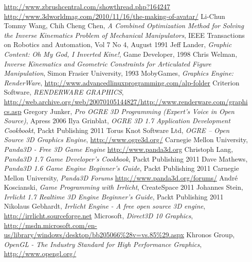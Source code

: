 \documentclass[11pt]{mwrep}
\begin{document}
\begin{thebibliography}{99}

\footnotesize
{} \url{http://www.zbrushcentral.com/showthread.php?164247}
 \url{http://www.3dworldmag.com/2010/11/16/the-making-of-avatar/}
 Li-Chun Tommy Wang, Chih Cheng Chen, \textit{A Combined Optimization Method for Solving the Inverse Kinematics Problem of Mechanical Manipulators}, IEEE Transactions on Robotics and Automation, Vol 7 No 4, August 1991
 Jeff Lander, \textit{Graphic Content: Oh My God, I Inverted Kine!}, Game Developer, 1998
 Chris Welman, \textit{Inverse Kinematics and Geometric Constraints for Articulated Figure Manipulation}, Simon Frasier University, 1993
 MobyGames, \textit{Graphics Engine: RenderWare}, \url{http://www.advancedlinuxprogramming.com/alp-folder}
 Criterion Software, \textit{RENDERWARE GRAPHICS}, \url{http://web.archive.org/web/20070105144827/http://www.renderware.com/graphics.asp}
 Gregory Junker, \textit{Pro OGRE 3D Programming (Expert's Voice in Open Source)}, Apress 2006
 Ilya Grinblat, \textit{OGRE 3D 1.7 Application Development Cookbookt}, Packt Publishing 2011
 Torus Knot Software Ltd, \textit{OGRE -- Open Source 3D Graphics Engine}, \url{http://www.ogre3d.org/}
 Carnegie Mellon University, \textit{Panda3D - Free 3D Game Engine} \url{http://www.panda3d.org}
 Christoph Lang, \textit{Panda3D 1.7 Game Developer's Cookbook}, Packt Publishing 2011
 Dave Mathews, \textit{Panda3D 1.6 Game Engine Beginner's Guide}, Packt Publishing 2011
 Carnegie Mellon University, \textit{Panda3D Forums} \url{http://www.panda3d.org/forums/}
 André Koscianski, \textit{Game Programming with Irrlicht}, CreateSpace 2011
 Johannes Stein, \textit{Irrlicht 1.7 Realtime 3D Engine Beginner's Guide}, Packt Publishing 2011
 Nikolaus Gebhardt, \textit{Irrlicht Engine - A free open source 3D engine}, \url{http://irrlicht.sourceforge.net}
 Microsoft, \textit{Direct3D 10 Graphics}, \url{http://msdn.microsoft.com/en-us/library/windows/desktop/bb205066%28v=vs.85%29.aspx}
 Khronos Group, \textit{OpenGL - The Industry Standard for High Performance Graphics}, \url{http://www.opengl.org/}

\end{thebibliography}

\end{document}
